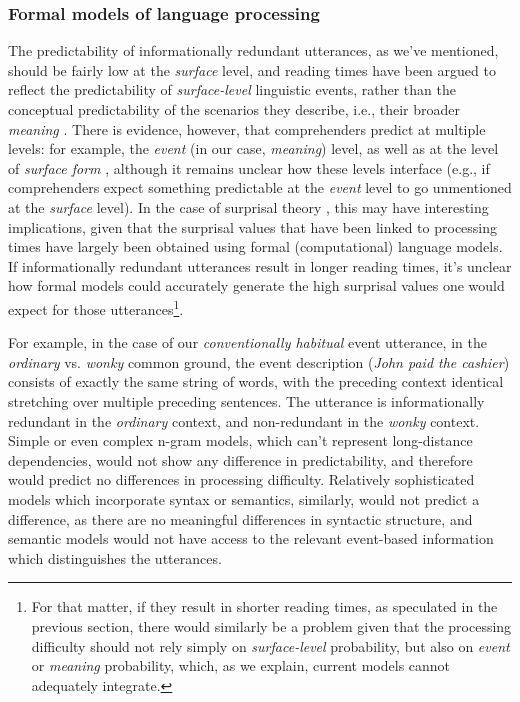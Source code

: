 \subsubsection{Formal models of language
processing}\label{formal-models-of-language-processing}

The predictability of informationally redundant utterances, as we've
mentioned, should be fairly low at the \emph{surface} level, and reading
times have been argued to reflect the predictability of
\emph{surface-level} linguistic events, rather than the conceptual
predictability of the scenarios they describe, i.e., their broader
\emph{meaning} \citep{Smith2013}. There is evidence, however, that
comprehenders predict at multiple levels: for example, the \emph{event}
(in our case, \emph{meaning}) level, as well as at the level of
\emph{surface form} \citep{Kuperberg2016}, although it remains
unclear how these levels interface (e.g., if comprehenders expect
something predictable at the \emph{event} level to go unmentioned at the
\emph{surface} level). In the case of surprisal theory \citep{Hale2001,
Levy2008}, this may have interesting implications, given that the
surprisal values that have been linked to processing times have largely
been obtained using formal (computational) language models. If
informationally redundant utterances result in longer reading times,
it's unclear how formal models could accurately generate the high
surprisal values one would expect for those utterances\footnote{For that
  matter, if they result in shorter reading times, as speculated in the
  previous section, there would similarly be a problem given that the
  processing difficulty should not rely simply on \emph{surface-level}
  probability, but also on \emph{event} or \emph{meaning} probability,
  which, as we explain, current models cannot adequately integrate.}.

For example, in the case of our \emph{conventionally habitual} event
utterance, in the \emph{ordinary} vs. \emph{wonky} common ground, the
event description (\emph{John paid the cashier}) consists of exactly the
same string of words, with the preceding context identical stretching
over multiple preceding sentences. The utterance is informationally
redundant in the \emph{ordinary} context, and non-redundant in the
\emph{wonky} context. Simple or even complex n-gram models, which can't
represent long-distance dependencies, would not show any difference in
predictability, and therefore would predict no differences in processing
difficulty. Relatively sophisticated models which incorporate syntax or
semantics, similarly, would not predict a difference, as there are no
meaningful differences in syntactic structure, and semantic models would
not have access to the relevant event-based information which
distinguishes the utterances.

